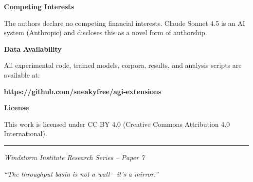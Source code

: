 \documentclass[11pt,a4paper]{article}
\begin{document}
\vspace{0.5cm}

\noindent\textbf{Competing Interests}

The authors declare no competing financial interests. Claude Sonnet 4.5 is an AI system (Anthropic) and discloses this as a novel form of authorship.

\vspace{0.5cm}

\noindent\textbf{Data Availability}

All experimental code, trained models, corpora, results, and analysis scripts are available at:

\textbf{https://github.com/sneakyfree/agi-extensions}

\vspace{0.5cm}

\noindent\textbf{License}

This work is licensed under CC BY 4.0 (Creative Commons Attribution 4.0 International).

\vspace{1cm}

\noindent\rule{\textwidth}{0.4pt}

\vspace{0.5cm}

\noindent\textit{Windstorm Institute Research Series -- Paper 7}

\noindent\textit{``The throughput basin is not a wall---it's a mirror.''}
\end{document}
